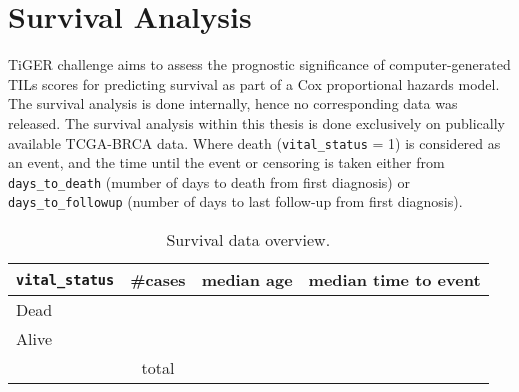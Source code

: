 \section{Survival Analysis}
TiGER challenge aims to assess the prognostic significance of computer-generated TILs scores
for predicting survival as part of a Cox proportional hazards model. The survival analysis
is done internally, hence no corresponding data was released. The survival analysis
within this thesis is done exclusively on publically available TCGA-BRCA data. Where death
(\texttt{vital\_status} = 1) is considered as an event, and the time until the event or censoring is
taken either from \texttt{days\_to\_death} (mumber of days to death from first diagnosis) or \texttt{days\_to\_followup}
(number of days to last follow-up from first diagnosis). 
\begin{table}[h!]
\centering
\begin{tabular}{ l c c c } 
\hline
\texttt{vital\_status} & \#cases & median age & median time to event\\ 
\hline
Dead &  &  & \\ 
Alive &  &  & \\ 
\hline
 & total & & \\
\end{tabular}
\caption{\label{tab:surv_data}Survival data overview.}
\end{table}
